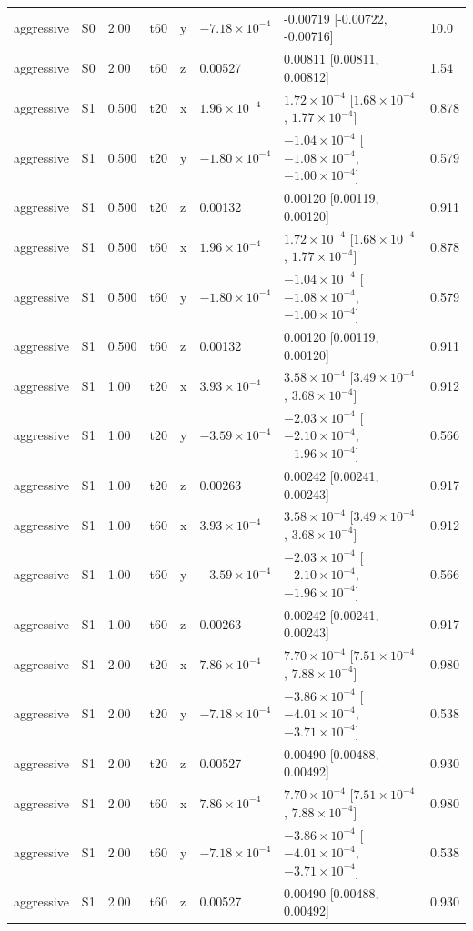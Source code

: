 {\begin{longtable}{llllllll}
aggressive & S0 & 2.00 & t60 & y & $-7.18\times10^{-4}$ & -0.00719 [-0.00722, -0.00716] & 10.0 \\
aggressive & S0 & 2.00 & t60 & z & 0.00527 & 0.00811 [0.00811, 0.00812] & 1.54 \\
aggressive & S1 & 0.500 & t20 & x & $1.96\times10^{-4}$ & $1.72\times10^{-4}$ [$1.68\times10^{-4}$, $1.77\times10^{-4}$] & 0.878 \\
aggressive & S1 & 0.500 & t20 & y & $-1.80\times10^{-4}$ & $-1.04\times10^{-4}$ [$-1.08\times10^{-4}$, $-1.00\times10^{-4}$] & 0.579 \\
aggressive & S1 & 0.500 & t20 & z & 0.00132 & 0.00120 [0.00119, 0.00120] & 0.911 \\
aggressive & S1 & 0.500 & t60 & x & $1.96\times10^{-4}$ & $1.72\times10^{-4}$ [$1.68\times10^{-4}$, $1.77\times10^{-4}$] & 0.878 \\
aggressive & S1 & 0.500 & t60 & y & $-1.80\times10^{-4}$ & $-1.04\times10^{-4}$ [$-1.08\times10^{-4}$, $-1.00\times10^{-4}$] & 0.579 \\
aggressive & S1 & 0.500 & t60 & z & 0.00132 & 0.00120 [0.00119, 0.00120] & 0.911 \\
aggressive & S1 & 1.00 & t20 & x & $3.93\times10^{-4}$ & $3.58\times10^{-4}$ [$3.49\times10^{-4}$, $3.68\times10^{-4}$] & 0.912 \\
aggressive & S1 & 1.00 & t20 & y & $-3.59\times10^{-4}$ & $-2.03\times10^{-4}$ [$-2.10\times10^{-4}$, $-1.96\times10^{-4}$] & 0.566 \\
aggressive & S1 & 1.00 & t20 & z & 0.00263 & 0.00242 [0.00241, 0.00243] & 0.917 \\
aggressive & S1 & 1.00 & t60 & x & $3.93\times10^{-4}$ & $3.58\times10^{-4}$ [$3.49\times10^{-4}$, $3.68\times10^{-4}$] & 0.912 \\
aggressive & S1 & 1.00 & t60 & y & $-3.59\times10^{-4}$ & $-2.03\times10^{-4}$ [$-2.10\times10^{-4}$, $-1.96\times10^{-4}$] & 0.566 \\
aggressive & S1 & 1.00 & t60 & z & 0.00263 & 0.00242 [0.00241, 0.00243] & 0.917 \\
aggressive & S1 & 2.00 & t20 & x & $7.86\times10^{-4}$ & $7.70\times10^{-4}$ [$7.51\times10^{-4}$, $7.88\times10^{-4}$] & 0.980 \\
aggressive & S1 & 2.00 & t20 & y & $-7.18\times10^{-4}$ & $-3.86\times10^{-4}$ [$-4.01\times10^{-4}$, $-3.71\times10^{-4}$] & 0.538 \\
aggressive & S1 & 2.00 & t20 & z & 0.00527 & 0.00490 [0.00488, 0.00492] & 0.930 \\
aggressive & S1 & 2.00 & t60 & x & $7.86\times10^{-4}$ & $7.70\times10^{-4}$ [$7.51\times10^{-4}$, $7.88\times10^{-4}$] & 0.980 \\
aggressive & S1 & 2.00 & t60 & y & $-7.18\times10^{-4}$ & $-3.86\times10^{-4}$ [$-4.01\times10^{-4}$, $-3.71\times10^{-4}$] & 0.538 \\
aggressive & S1 & 2.00 & t60 & z & 0.00527 & 0.00490 [0.00488, 0.00492] & 0.930 \\
\bottomrule
\end{longtable}
}
